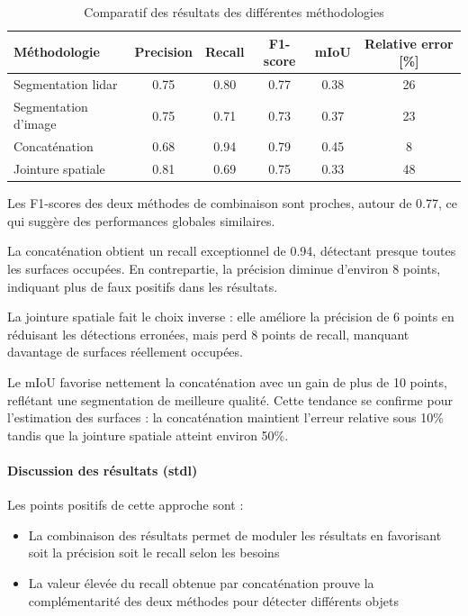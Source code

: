 \begin{table}[H]
    \centering
    \begin{tabular}{|l|c|c|c|c|c|}
    \hline
    Méthodologie & Precision & Recall & F1-score & mIoU & Relative error [\%] \\
    \hline
    Segmentation \gls{lidar} & 0.75 & 0.80 & 0.77 & 0.38 & 26 \\
    Segmentation d'image & 0.75 & 0.71 & 0.73 & 0.37 & 23 \\
    Concaténation & 0.68 & 0.94 & 0.79 & 0.45 & 8 \\
    Jointure spatiale & 0.81 & 0.69 & 0.75 & 0.33 & 48 \\
    \hline
    \end{tabular}
    \caption{Comparatif des résultats des différentes méthodologies}
    \label{tab:stdl_09_resultats_methodos}
\end{table}

\par{Les F1-scores des deux méthodes de combinaison sont proches, autour de 0.77, ce qui suggère des performances globales similaires.}

\par{La concaténation obtient un recall exceptionnel de 0.94, détectant presque toutes les surfaces occupées. En contrepartie, la précision diminue d'environ 8 points, indiquant plus de faux positifs dans les résultats.}

\par{La jointure spatiale fait le choix inverse : elle améliore la précision de 6 points en réduisant les détections erronées, mais perd 8 points de recall, manquant davantage de surfaces réellement occupées.}

\par{Le mIoU favorise nettement la concaténation avec un gain de plus de 10 points, reflétant une segmentation de meilleure qualité. Cette tendance se confirme pour l'estimation des surfaces : la concaténation maintient l'erreur relative sous 10\% tandis que la jointure spatiale atteint environ 50\%.}

\paragraph{Discussion des résultats (\acrshort{stdl})}

Les points positifs de cette approche sont :
\begin{itemize}
    \item La combinaison des résultats permet de moduler les résultats en favorisant soit la précision soit le recall selon les besoins
    \item La valeur élevée du recall obtenue par concaténation prouve la complémentarité des deux méthodes pour détecter différents objets
\end{itemize}

